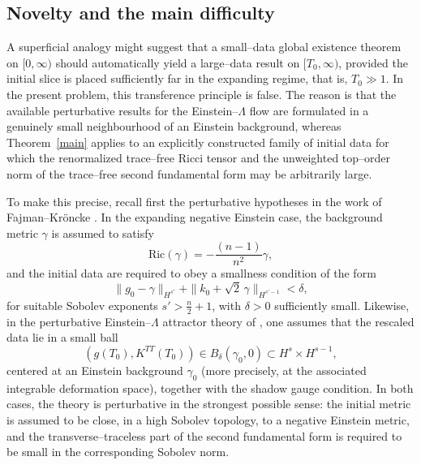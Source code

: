 \documentclass{amsart}
\begin{document}
\subsection{Novelty and the main difficulty }
A superficial analogy might suggest that a small--data global existence theorem on
\([0,\infty)\) should automatically yield a large--data result on \([T_{0},\infty)\), provided
the initial slice is placed sufficiently far in the expanding regime, that is, \(T_{0}\gg1\).
In the present problem, this transference principle is false.  The reason is that the
available perturbative results for the Einstein--\(\Lambda\) flow are formulated in a genuinely
small neighbourhood of an Einstein background, whereas Theorem~\ref{main} applies to
an explicitly constructed family of initial data for which the renormalized trace--free
Ricci tensor and the unweighted top--order norm of the trace--free second fundamental
form may be arbitrarily large.

\noindent To make this precise, recall first the perturbative hypotheses in the work of
Fajman--Kr\"oncke \cite{fajman2020stable}.  In the expanding negative Einstein case, the background metric
\(\gamma\) is assumed to satisfy
\[
\text{Ric}(\gamma)=-\frac{(n-1)}{n^{2}}\gamma,
\]
and the initial data are required to obey a smallness condition of the form
\begin{equation}
\label{eq:FK-small}
\|g_{0}-\gamma\|_{H^{s'}}+\|k_{0}+\sqrt{2}\,\gamma\|_{H^{s'-1}}<\delta,
\end{equation}
for suitable Sobolev exponents \(s'>\frac n2+1\), with \(\delta>0\)
sufficiently small.  Likewise, in the perturbative Einstein--\(\Lambda\) attractor theory of
\cite{mondal2019attractors}, one assumes that the rescaled data lie in a small ball
\begin{equation}
\label{eq:Mondal-small}
(g(T_{0}),K^{TT}(T_{0}))\in B_{\delta}(\gamma_{0},0)\subset H^{s}\times H^{s-1},
\end{equation}
centered at an Einstein background \(\gamma_{0}\) (more precisely, at the associated
integrable deformation space), together with the shadow gauge condition.  In both
cases, the theory is perturbative in the strongest possible sense: the initial metric is
assumed to be close, in a high Sobolev topology, to a negative Einstein metric, and the
transverse--traceless part of the second fundamental form is required to be small in the
corresponding Sobolev norm.
\end{document}
